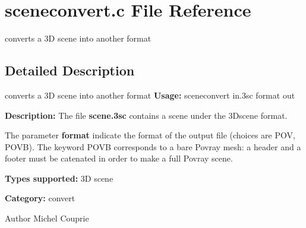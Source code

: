 \section{sceneconvert.c File Reference}
\label{sceneconvert_8c}


converts a 3D scene into another format  




\subsection{Detailed Description}
converts a 3D scene into another format {\bfseries Usage:} sceneconvert in.3sc format out

{\bfseries Description:} The file {\bfseries scene.3sc} contains a scene under the 3Dscene format.

The parameter {\bfseries format} indicate the format of the output file (choices are POV, POVB). The keyword POVB corresponds to a bare Povray mesh: a header and a footer must be catenated in order to make a full Povray scene.

{\bfseries Types supported:} 3D scene

{\bfseries Category:} convert

\begin{DoxyAuthor}{Author}
Michel Couprie 
\end{DoxyAuthor}
